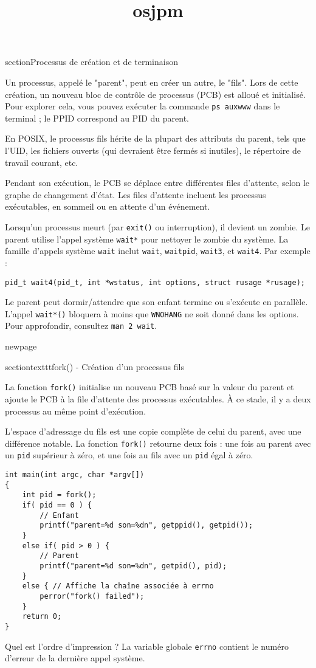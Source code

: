 \documentclass[12pt]{article}
\title{osjpm}
\author{}
\date{}
\begin{document}
\maketitle
\tableofcontents
\newpage

section{Processus de création et de terminaison}

Un processus, appelé le "parent", peut en créer un autre, le "fils". Lors de cette création, un nouveau bloc de contrôle de processus (PCB) est alloué et initialisé. Pour explorer cela, vous pouvez exécuter la commande \texttt{ps auxwww} dans le terminal ; le PPID correspond au PID du parent.

En POSIX, le processus fils hérite de la plupart des attributs du parent, tels que l'UID, les fichiers ouverts (qui devraient être fermés si inutiles), le répertoire de travail courant, etc.

Pendant son exécution, le PCB se déplace entre différentes files d'attente, selon le graphe de changement d'état. Les files d'attente incluent les processus exécutables, en sommeil ou en attente d'un événement.

Lorsqu'un processus meurt (par \texttt{exit()} ou interruption), il devient un zombie. Le parent utilise l'appel système \texttt{wait*} pour nettoyer le zombie du système. La famille d'appels système \texttt{wait} inclut \texttt{wait}, \texttt{waitpid}, \texttt{wait3}, et \texttt{wait4}. Par exemple :

\begin{lstlisting}
pid_t wait4(pid_t, int *wstatus, int options, struct rusage *rusage);
\end{lstlisting}

Le parent peut dormir/attendre que son enfant termine ou s'exécute en parallèle. L'appel \texttt{wait*()} bloquera à moins que \texttt{WNOHANG} ne soit donné dans les options. Pour approfondir, consultez \texttt{man 2 wait}.

newpage

section{texttt{fork()} - Création d'un processus fils}

La fonction \texttt{fork()} initialise un nouveau PCB basé sur la valeur du parent et ajoute le PCB à la file d'attente des processus exécutables. À ce stade, il y a deux processus au même point d'exécution.

L'espace d'adressage du fils est une copie complète de celui du parent, avec une différence notable. La fonction \texttt{fork()} retourne deux fois : une fois au parent avec un \texttt{pid} supérieur à zéro, et une fois au fils avec un \texttt{pid} égal à zéro.

\begin{lstlisting}
int main(int argc, char *argv[])
{
    int pid = fork();
    if( pid == 0 ) {
        // Enfant
        printf("parent=%d son=%dn", getppid(), getpid());
    }
    else if( pid > 0 ) {
        // Parent
        printf("parent=%d son=%dn", getpid(), pid);
    }
    else { // Affiche la chaîne associée à errno
        perror("fork() failed");
    }
    return 0;
}
\end{lstlisting}

Quel est l'ordre d'impression ? La variable globale \texttt{errno} contient le numéro d'erreur de la dernière appel système.
\end{document}
